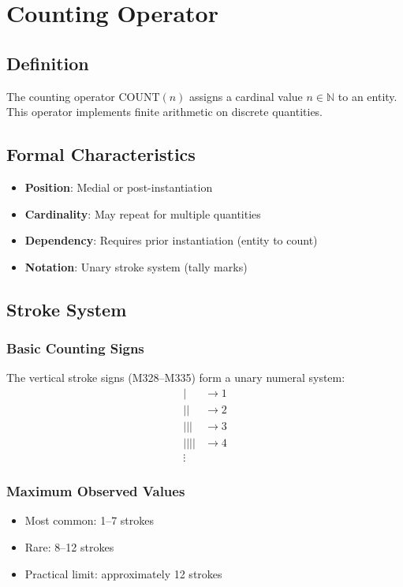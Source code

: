 \section{Counting Operator}

\subsection{Definition}

The counting operator $\text{COUNT}(n)$ assigns a cardinal value $n \in \mathbb{N}$ to an entity. This operator implements finite arithmetic on discrete quantities.

\subsection{Formal Characteristics}

\begin{itemize}
    \item \textbf{Position}: Medial or post-instantiation
    \item \textbf{Cardinality}: May repeat for multiple quantities
    \item \textbf{Dependency}: Requires prior instantiation (entity to count)
    \item \textbf{Notation}: Unary stroke system (tally marks)
\end{itemize}

\subsection{Stroke System}

\subsubsection{Basic Counting Signs}
The vertical stroke signs (M328--M335) form a unary numeral system:
\begin{align*}
    | &\rightarrow 1 \\
    || &\rightarrow 2 \\
    ||| &\rightarrow 3 \\
    |||| &\rightarrow 4 \\
    \vdots
\end{align*}

\subsubsection{Maximum Observed Values}
\begin{itemize}
    \item Most common: 1--7 strokes
    \item Rare: 8--12 strokes
    \item Practical limit: approximately 12 strokes
\end{itemize}


